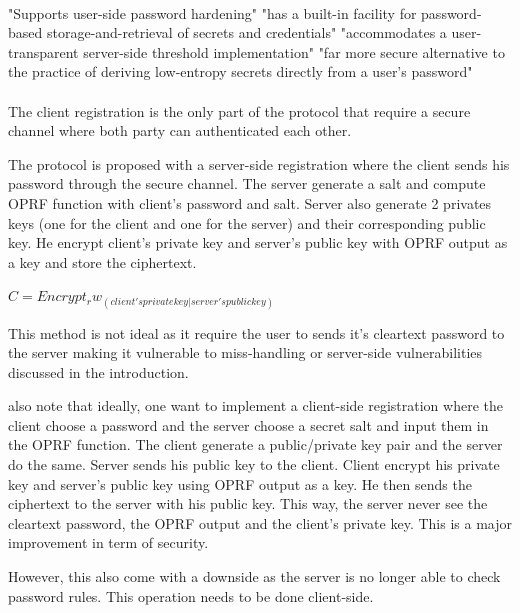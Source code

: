 \documentclass[../report.tex]{subfiles}
\begin{document}
\paragraph{}

     "Supports user-side password hardening"
     "has a built-in facility for password-based storage-and-retrieval of secrets and credentials"
     "accommodates a user-transparent server-side threshold implementation"
     "far more secure alternative to the practice of deriving low-entropy secrets directly from a user's password"


\paragraph{} \label{sec:opaque_register}
The client registration is the only part of the protocol that require a secure channel where both party can authenticated each other.


The protocol is proposed with a server-side registration where the client sends his password through the secure channel. The server generate a salt and compute OPRF function with client's password and salt. Server also generate 2 privates keys (one for the client and one for the server) and their corresponding public key. He encrypt client's private key and server's public key with OPRF output as a key and store the ciphertext.


$C = Encrypt_rw_(client's private key | server's public key)$


This method is not ideal as it require the user to sends it's cleartext password to the server making it vulnerable to miss-handling or server-side vulnerabilities discussed in the introduction.



\cite{OPAQUE_Paper} also note that ideally, one want to implement a client-side registration where the client choose a password and the server choose a secret salt and input them in the OPRF function. The client generate a public/private key pair and the server do the same. Server sends his public key to the client. Client encrypt his private key and server's public key using OPRF output as a key. He then sends the ciphertext to the server with his public key.
This way, the server never see the cleartext password, the OPRF output and the client's private key. This is a major improvement in term of security.

However, this also come with a downside as the server is no longer able to check password rules. This operation needs to be done client-side.
\end{document}
